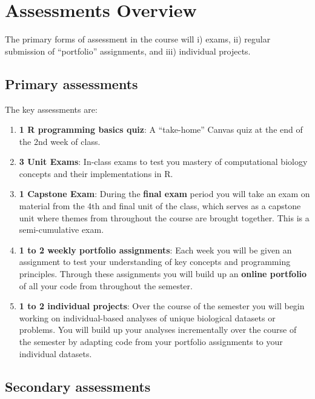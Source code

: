\documentclass[
]{book}
\providecommand{\tightlist}{%
  \setlength{\itemsep}{0pt}\setlength{\parskip}{0pt}}
\begin{document}
\hypertarget{assessments}{%
\chapter{Assessments Overview}\label{assessments}}

The primary forms of assessment in the course will i) exams, ii) regular submission of ``portfolio'' assignments, and iii) individual projects.

\hypertarget{primary-assessments}{%
\section{Primary assessments}\label{primary-assessments}}

The key assessments are:

\begin{enumerate}
\def\labelenumi{\arabic{enumi}.}
\tightlist
\item
  \textbf{1 R programming basics quiz}: A ``take-home'' Canvas quiz at the end of the 2nd week of class.\\
\item
  \textbf{3 Unit Exams}: In-class exams to test you mastery of computational biology concepts and their implementations in R.
\item
  \textbf{1 Capstone Exam}: During the \textbf{final exam} period you will take an exam on material from the 4th and final unit of the class, which serves as a capstone unit where themes from throughout the course are brought together. This is a semi-cumulative exam.\\
\item
  \textbf{1 to 2 weekly portfolio assignments}: Each week you will be given an assignment to test your understanding of key concepts and programming principles. Through these assignments you will build up an \textbf{online portfolio} of all your code from throughout the semester.
\item
  \textbf{1 to 2 individual projects}: Over the course of the semester you will begin working on individual-based analyses of unique biological datasets or problems. You will build up your analyses incrementally over the course of the semester by adapting code from your portfolio assignments to your individual datasets.
\end{enumerate}

\hypertarget{secondary-assessments}{%
\section{Secondary assessments}\label{secondary-assessments}}
\end{document}
